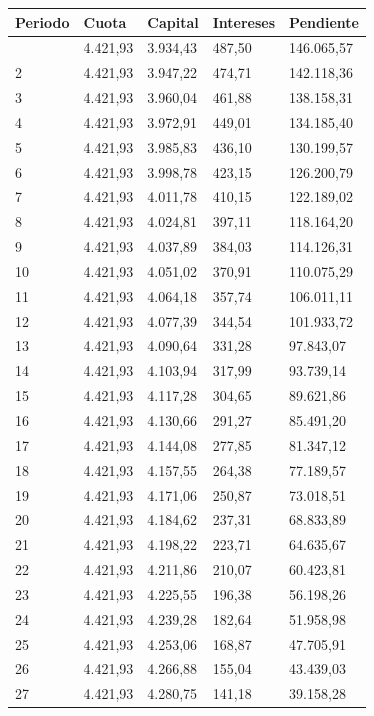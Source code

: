 \documentclass[
  letterpaper,
  DIV=11,
  numbers=noendperiod]{scrartcl}
\begin{document}
\begin{tcolorbox}
\begin{longtable}[]{@{}lllll@{}}
\toprule\noalign{}
Periodo & Cuota & Capital & Intereses & Pendiente \\
\midrule\noalign{}
\endhead
\bottomrule\noalign{}
\endlastfoot
1 & 4.421,93 & 3.934,43 & 487,50 & 146.065,57 \\
2 & 4.421,93 & 3.947,22 & 474,71 & 142.118,36 \\
3 & 4.421,93 & 3.960,04 & 461,88 & 138.158,31 \\
4 & 4.421,93 & 3.972,91 & 449,01 & 134.185,40 \\
5 & 4.421,93 & 3.985,83 & 436,10 & 130.199,57 \\
6 & 4.421,93 & 3.998,78 & 423,15 & 126.200,79 \\
7 & 4.421,93 & 4.011,78 & 410,15 & 122.189,02 \\
8 & 4.421,93 & 4.024,81 & 397,11 & 118.164,20 \\
9 & 4.421,93 & 4.037,89 & 384,03 & 114.126,31 \\
10 & 4.421,93 & 4.051,02 & 370,91 & 110.075,29 \\
11 & 4.421,93 & 4.064,18 & 357,74 & 106.011,11 \\
12 & 4.421,93 & 4.077,39 & 344,54 & 101.933,72 \\
13 & 4.421,93 & 4.090,64 & 331,28 & 97.843,07 \\
14 & 4.421,93 & 4.103,94 & 317,99 & 93.739,14 \\
15 & 4.421,93 & 4.117,28 & 304,65 & 89.621,86 \\
16 & 4.421,93 & 4.130,66 & 291,27 & 85.491,20 \\
17 & 4.421,93 & 4.144,08 & 277,85 & 81.347,12 \\
18 & 4.421,93 & 4.157,55 & 264,38 & 77.189,57 \\
19 & 4.421,93 & 4.171,06 & 250,87 & 73.018,51 \\
20 & 4.421,93 & 4.184,62 & 237,31 & 68.833,89 \\
21 & 4.421,93 & 4.198,22 & 223,71 & 64.635,67 \\
22 & 4.421,93 & 4.211,86 & 210,07 & 60.423,81 \\
23 & 4.421,93 & 4.225,55 & 196,38 & 56.198,26 \\
24 & 4.421,93 & 4.239,28 & 182,64 & 51.958,98 \\
25 & 4.421,93 & 4.253,06 & 168,87 & 47.705,91 \\
26 & 4.421,93 & 4.266,88 & 155,04 & 43.439,03 \\
27 & 4.421,93 & 4.280,75 & 141,18 & 39.158,28 \\

\end{longtable}
\end{tcolorbox}
\end{document}
